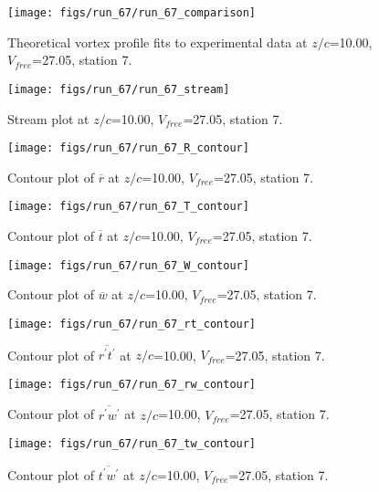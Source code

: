 \begin{figure}[H]
\centering
\texttt{[image: figs/run\_67/run\_67\_comparison]}
\caption{Theoretical vortex profile fits to experimental data at $z/c$=10.00, $V_{free}$=27.05, station 7.}
\label{fig:run_67_comparison}
\end{figure}


\begin{figure}[H]
\centering
\texttt{[image: figs/run\_67/run\_67\_stream]}
\caption{Stream plot at $z/c$=10.00, $V_{free}$=27.05, station 7.}
\label{fig:run_67_stream}
\end{figure}


\begin{figure}[H]
\centering
\texttt{[image: figs/run\_67/run\_67\_R\_contour]}
\caption{Contour plot of $\overline{r}$ at $z/c$=10.00, $V_{free}$=27.05, station 7.}
\label{fig:run_67_R_contour}
\end{figure}


\begin{figure}[H]
\centering
\texttt{[image: figs/run\_67/run\_67\_T\_contour]}
\caption{Contour plot of $\overline{t}$ at $z/c$=10.00, $V_{free}$=27.05, station 7.}
\label{fig:run_67_T_contour}
\end{figure}


\begin{figure}[H]
\centering
\texttt{[image: figs/run\_67/run\_67\_W\_contour]}
\caption{Contour plot of $\overline{w}$ at $z/c$=10.00, $V_{free}$=27.05, station 7.}
\label{fig:run_67_W_contour}
\end{figure}


\begin{figure}[H]
\centering
\texttt{[image: figs/run\_67/run\_67\_rt\_contour]}
\caption{Contour plot of $\overline{r^\prime t^\prime}$ at $z/c$=10.00, $V_{free}$=27.05, station 7.}
\label{fig:run_67_rt_contour}
\end{figure}


\begin{figure}[H]
\centering
\texttt{[image: figs/run\_67/run\_67\_rw\_contour]}
\caption{Contour plot of $\overline{r^\prime w^\prime}$ at $z/c$=10.00, $V_{free}$=27.05, station 7.}
\label{fig:run_67_rw_contour}
\end{figure}


\begin{figure}[H]
\centering
\texttt{[image: figs/run\_67/run\_67\_tw\_contour]}
\caption{Contour plot of $\overline{t^\prime w^\prime}$ at $z/c$=10.00, $V_{free}$=27.05, station 7.}
\label{fig:run_67_tw_contour}
\end{figure}


